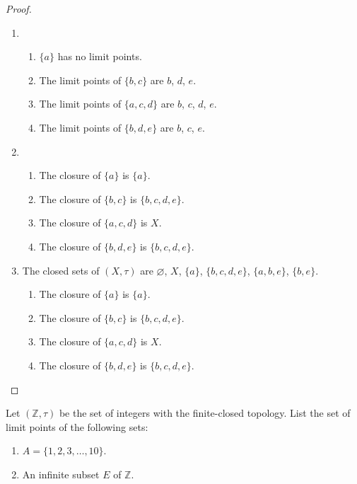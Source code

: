 \begin{proof}
    \begin{enumerate}[label={(\alph*)}]
        \item \begin{enumerate}[label={(\roman*)}]
                  \item $\{a\}$ has no limit points.
                  \item The limit points of $\{b,c\}$ are $b$, $d$, $e$.
                  \item The limit points of $\{a,c,d\}$ are $b$, $c$, $d$, $e$.
                  \item The limit points of $\{b,d,e\}$ are $b$, $c$, $e$.
              \end{enumerate}
        \item \begin{enumerate}[label={(\roman*)}]
                  \item The closure of $\{a\}$ is $\{a\}$.
                  \item The closure of $\{b,c\}$ is $\{b,c,d,e\}$.
                  \item The closure of $\{a,c,d\}$ is $X$.
                  \item The closure of $\{b,d,e\}$ is $\{b,c,d,e\}$.
              \end{enumerate}
        \item The closed sets of $(X, \tau)$ are $\varnothing$, $X$, $\{a\}$, $\{b,c,d,e\}$, $\{a,b,e\}$, $\{b,e\}$.

              \begin{enumerate}[label={(\roman*)}]
                  \item The closure of $\{a\}$ is $\{a\}$.
                  \item The closure of $\{b,c\}$ is $\{b,c,d,e\}$.
                  \item The closure of $\{a,c,d\}$ is $X$.
                  \item The closure of $\{b,d,e\}$ is $\{b,c,d,e\}$.
              \end{enumerate}
    \end{enumerate}
\end{proof}
\newpage

\begin{exercise}
    Let $(\mathbb{Z}, \tau)$ be the set of integers with the finite-closed topology. List the set of limit points of the following sets:
    \begin{enumerate}[label={(\roman*)}]
        \item $A = \{1,2,3,\ldots,10\}$.
        \item An infinite subset $E$ of $\mathbb{Z}$.
    \end{enumerate}
\end{exercise}


